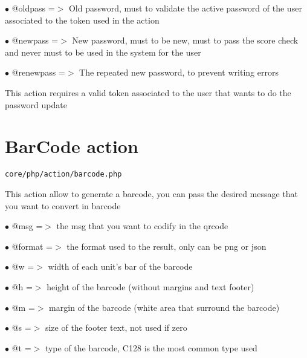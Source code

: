 \documentclass[a4paper]{book}
\begin{document}
\begin{compactitem}
\item[\color{myblue}$\bullet$] @oldpass   =$>$ Old password, must to validate the active password of the user
              associated to the token used in the action
\item[\color{myblue}$\bullet$] @newpass   =$>$ New password, must to be new, must to pass the score check and
              never must to be used in the system for the user
\item[\color{myblue}$\bullet$] @renewpass =$>$ The repeated new password, to prevent writing errors
\end{compactitem}

This action requires a valid token associated to the user that wants to do
the password update

\hypertarget{toc8}{}
\section{BarCode action}

\begin{lstlisting}
core/php/action/barcode.php
\end{lstlisting}

This action allow to generate a barcode, you can pass the desired
message that you want to convert in barcode

\begin{compactitem}
\item[\color{myblue}$\bullet$] @msg    =$>$ the msg that you want to codify in the qrcode
\item[\color{myblue}$\bullet$] @format =$>$ the format used to the result, only can be png or json
\end{compactitem}

\begin{compactitem}
\item[\color{myblue}$\bullet$] @w =$>$ width of each unit's bar of the barcode
\item[\color{myblue}$\bullet$] @h =$>$ height of the barcode (without margins and text footer)
\item[\color{myblue}$\bullet$] @m =$>$ margin of the barcode (white area that surround the barcode)
\item[\color{myblue}$\bullet$] @s =$>$ size of the footer text, not used if zero
\item[\color{myblue}$\bullet$] @t =$>$ type of the barcode, C128 is the most common type used
\end{compactitem}
\end{document}
